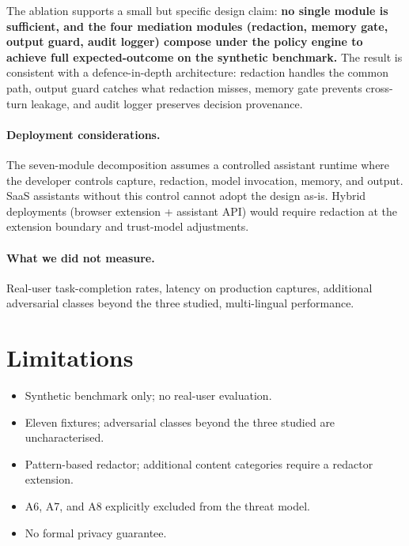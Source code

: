 \documentclass[sn-mathphys-num]{sn-jnl}
\begin{document}
The ablation supports a small but specific design claim: \textbf{no single
module is sufficient, and the four mediation modules (redaction, memory gate,
output guard, audit logger) compose under the policy engine to achieve full
expected-outcome on the synthetic benchmark.}
The result is consistent with a defence-in-depth architecture: redaction handles
the common path, output guard catches what redaction misses, memory gate prevents
cross-turn leakage, and audit logger preserves decision provenance.

\paragraph{Deployment considerations.}
The seven-module decomposition assumes a controlled assistant runtime where the
developer controls capture, redaction, model invocation, memory, and output.
SaaS assistants without this control cannot adopt the design as-is. Hybrid
deployments (browser extension + assistant API) would require redaction at the
extension boundary and trust-model adjustments.

\paragraph{What we did not measure.}
Real-user task-completion rates, latency on production captures, additional
adversarial classes beyond the three studied, multi-lingual performance.

\section{Limitations}\label{sec:limitations}

\begin{itemize}
  \item Synthetic benchmark only; no real-user evaluation.
  \item Eleven fixtures; adversarial classes beyond the three studied are
        uncharacterised.
  \item Pattern-based redactor; additional content categories require a
        redactor extension.
  \item A6, A7, and A8 explicitly excluded from the threat model.
  \item No formal privacy guarantee.
\end{itemize}
\end{document}
